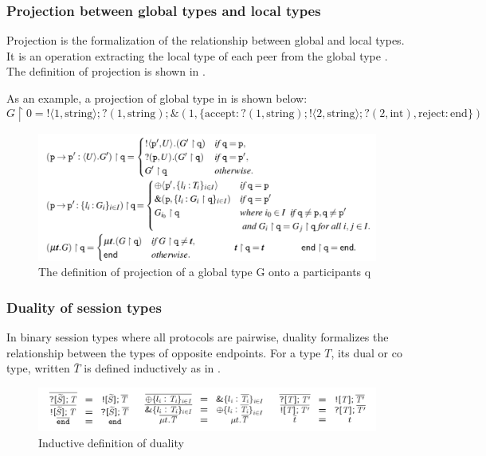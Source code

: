 \subsubsection{Projection between global types and local types} \label{b:mpst:proj}
Projection is the formalization of the relationship between global and local types. It is an operation extracting the local type of each peer from the global type \cite{coppoGentleIntroductionMultiparty2015}. The definition of projection is shown in .

As an example, a projection of global type in  is shown below:
$$
  G \upharpoonright 0 = !\langle 1, \text{string} \rangle;?(1, \text{string});\&(1, \{ \text{accept}: ?(1, \text{string});!\langle 2, \text{string} \rangle;?(2, \text{int}), 
  \text{reject}: \text{end} \})
$$  
\begin{figure}[H]
\includegraphics[width=\textwidth]{background/image/proj-def.png}
\caption{The definition of projection of a global type G onto a participants q\cite{coppoGentleIntroductionMultiparty2015}}
\label{b:mpst:pdef}
\end{figure}
\subsubsection{Duality of session types}
In binary session types where all protocols are pairwise, duality formalizes the relationship between the types of opposite endpoints. For a type $T$, its dual or co type, written $\bar{T}$ is defined inductively as in .
\begin{figure}[H]
\includegraphics[width=\textwidth]{background/image/dual-def.png}
\caption{Inductive definition of duality}
\label{b:mpst:dualdef}
\end{figure}

